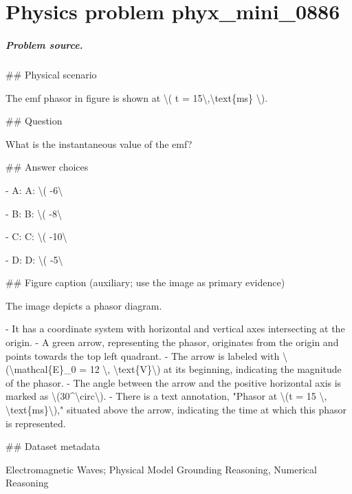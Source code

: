 
\chapter{Physics problem phyx\_mini\_0886}
\label{ch:PhyXMiniProblems_problem_phyx_mini_0886}

\paragraph{Problem source.}
\#\# Physical scenario

The emf phasor in figure is shown at \textbackslash{}( t = 15\textbackslash{},\textbackslash{}text\{ms\} \textbackslash{}).

\#\# Question

What is the instantaneous value of the emf?

\#\# Answer choices

- A: A: \textbackslash{}( -6\textbackslash{}

- B: B: \textbackslash{}( -8\textbackslash{}

- C: C: \textbackslash{}( -10\textbackslash{}

- D: D: \textbackslash{}( -5\textbackslash{}

\#\# Figure caption (auxiliary; use the image as primary evidence)

The image depicts a phasor diagram. 

- It has a coordinate system with horizontal and vertical axes intersecting at the origin.
- A green arrow, representing the phasor, originates from the origin and points towards the top left quadrant.
- The arrow is labeled with \textbackslash{}(\textbackslash{}mathcal\{E\}\_0 = 12 \textbackslash{}, \textbackslash{}text\{V\}\textbackslash{}) at its beginning, indicating the magnitude of the phasor.
- The angle between the arrow and the positive horizontal axis is marked as \textbackslash{}(30\textasciicircum{}\textbackslash{}circ\textbackslash{}).
- There is a text annotation, "Phasor at \textbackslash{}(t = 15 \textbackslash{}, \textbackslash{}text\{ms\}\textbackslash{})," situated above the arrow, indicating the time at which this phasor is represented.

\#\# Dataset metadata

Electromagnetic Waves; Physical Model Grounding Reasoning, Numerical Reasoning

